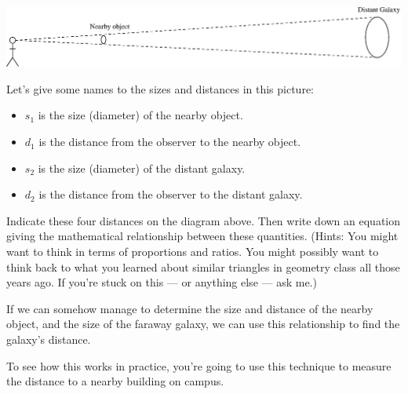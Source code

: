 \pagebreak[3]

\centerline{\includegraphics[width=6in]{localdistance/localdistance1.eps}}

Let's give some names to the sizes and distances in this picture:
\begin{itemize}
\item $s_1$ is the size (diameter) of the nearby object.
\item $d_1$ is the distance from the observer to the nearby object.
\item $s_2$ is the size (diameter) of the distant galaxy.
\item $d_2$ is the distance from the observer to the distant galaxy.
\end{itemize}

Indicate these four distances on the diagram above.  Then write down 
an equation giving the mathematical relationship between these
quantities.  (Hints: You might want to think in terms of 
proportions and ratios.  You might possibly want to think back to 
what you learned about similar triangles in geometry class all those years ago.
If you're stuck on this --- or anything else --- ask me.)

\vskip 1in

If we can somehow manage to determine the size and distance of
the nearby object, and the size of the faraway galaxy, we can 
use this relationship to find the galaxy's distance.

To see how this works in practice, you're going to use this
technique to measure the distance to a nearby building on campus.

